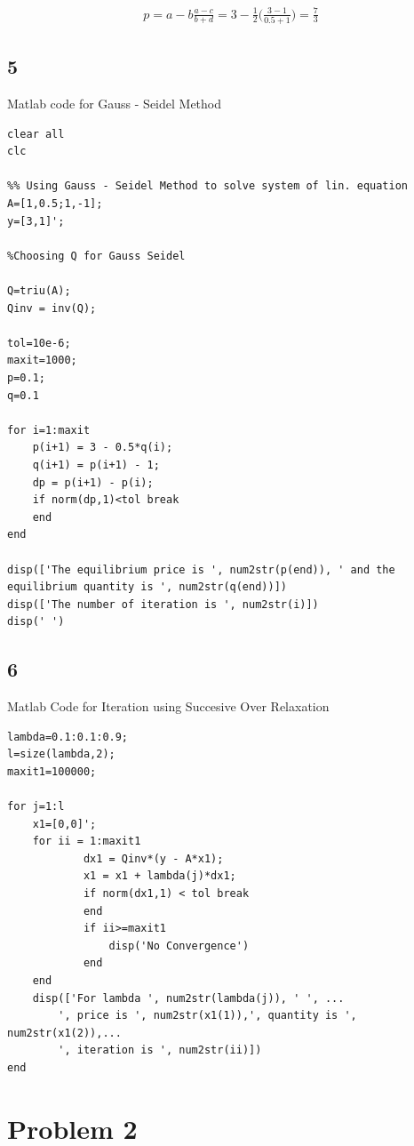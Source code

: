 \documentclass[12pt]{report}
\begin{document}
\begin{equation}
\begin{aligned}
p = a - b \frac{a - c}{b + d} = 3 - \frac{1}{2}\bigg(\frac{3 - 1}{0.5 + 1}\bigg) = \frac{7}{3}
\end{aligned}
\end{equation}

\subsection*{5}
Matlab code for Gauss - Seidel Method
\begin{lstlisting}
clear all
clc

%% Using Gauss - Seidel Method to solve system of lin. equation
A=[1,0.5;1,-1];
y=[3,1]';

%Choosing Q for Gauss Seidel

Q=triu(A);
Qinv = inv(Q);

tol=10e-6;
maxit=1000;
p=0.1;
q=0.1

for i=1:maxit
    p(i+1) = 3 - 0.5*q(i);
    q(i+1) = p(i+1) - 1;
    dp = p(i+1) - p(i);
    if norm(dp,1)<tol break
    end
end

disp(['The equilibrium price is ', num2str(p(end)), ' and the equilibrium quantity is ', num2str(q(end))])
disp(['The number of iteration is ', num2str(i)])
disp(' ')

\end{lstlisting}

\subsection*{6}
Matlab Code for Iteration using Succesive Over Relaxation
\begin{lstlisting}
lambda=0.1:0.1:0.9;
l=size(lambda,2);
maxit1=100000;

for j=1:l
    x1=[0,0]';
    for ii = 1:maxit1
            dx1 = Qinv*(y - A*x1);
            x1 = x1 + lambda(j)*dx1;
            if norm(dx1,1) < tol break
            end
            if ii>=maxit1
                disp('No Convergence')
            end
    end
    disp(['For lambda ', num2str(lambda(j)), ' ', ...
        ', price is ', num2str(x1(1)),', quantity is ', num2str(x1(2)),...
        ', iteration is ', num2str(ii)])
end
\end{lstlisting}

\section*{Problem 2}
\end{document}
